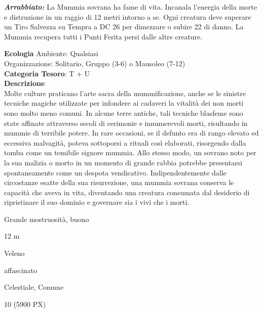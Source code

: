 \begin{multicols}{2}
{\emph{\textbf{Arrabbiato:}} La Mummia sovrana ha fame di vita. Incanala l'energia della morte e distruzione in un raggio di 12 metri intorno a se. Ogni creatura deve superare un Tiro Salvezza su Tempra a DC 26 per dimezzare o subire 22 di danno. La Mummia recupera tutti i Punti Ferita persi dalle altre creature.

\textbf{Ecologia}
Ambiente: Qualsiasi\\
Organizzazione: Solitario, Gruppo (3-6) o Mausoleo (7-12)\\
\textbf{Categoria Tesoro}: T + U\\
\textbf{Descrizione}\\
Molte culture praticano l'arte sacra della mummificazione, anche se le sinistre tecniche magiche utilizzate per infondere ai cadaveri la vitalità dei non morti sono molto meno comuni. In alcune terre antiche, tali tecniche blasfeme sono state affinate attraverso secoli di cerimonie e innumerevoli morti, risultando in mummie di terribile potere. In rare occasioni, se il defunto era di rango elevato ed eccessiva malvagità, poteva sottoporsi a rituali così elaborati, risorgendo dalla tomba come un temibile signore mummia. Allo stesso modo, un sovrano noto per la sua malizia o morto in un momento di grande rabbia potrebbe presentarsi spontaneamente come un despota vendicativo. Indipendentemente dalle circostanze esatte della sua risurrezione, una mummia sovrana conserva le capacità che aveva in vita, diventando una creatura consumata dal desiderio di ripristinare il suo dominio e governare sia i vivi che i morti.


\begin{description}[noitemsep, topsep=0pt, parsep=0pt, partopsep=0pt, itemsep=1pt, leftmargin=2.35cm,  labelwidth=2.2cm, itemindent=0cm, listparindent=0pt] %
\setlength{\baselineskip}{10pt}
\item[\textbf{Taglia/Tipo}] Grande mostruosità, buono
\item[\textbf{Caratt.}] 
\item[\textbf{Punti Ferita}] 
\item[\textbf{Movimento}] 12 m
\item[\textbf{Tiri Salvez.}] 
\item[\textbf{Imm. Danni}] Veleno
\item[\textbf{Immunità}] affascinato
\item[\textbf{Sensi}] 
\item[\textbf{Linguaggi}] Celestiale, Comune
\item[\textbf{Sfida}] 10 (5900 PX)
\end{description}
\smallskip

}
\end{multicols}
